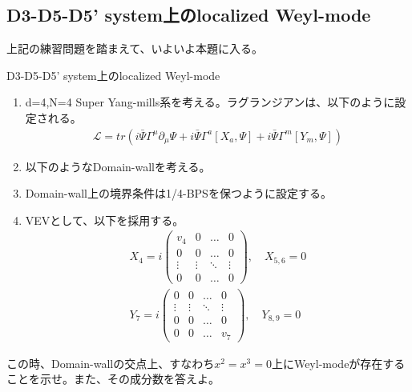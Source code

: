 \documentclass[dvipdfmx,a4paper,10.5pt]{article}
\numberwithin{equation}{section}
\begin{document}
\subsection{D3-D5-D5' system上のlocalized Weyl-mode}
上記の練習問題を踏まえて、いよいよ本題に入る。
\begin{problembox}{D3-D5-D5' system上のlocalized Weyl-mode}
    \begin{enumerate}
        \item d=4,N=4 Super Yang-mills系を考える。ラグランジアンは、以下のように設定される。
        \begin{align*}
            \mathcal{L}=tr(i\bar{\Psi}\Gamma^{\mu}\partial_{\mu}\Psi+i\bar{\Psi}\Gamma^{a}[X_{a},\Psi]+i\bar{\Psi}\Gamma^{m}[Y_{m},\Psi])
        \end{align*}
        \item 以下のようなDomain-wallを考える。
        \item Domain-wall上の境界条件は1/4-BPSを保つように設定する。
        \item VEVとして、以下を採用する。
        \begin{align*}
            X_{4}=i \begin{pmatrix} 
  v_{4} & 0 & \dots  & 0 \\
  0 & 0 & \dots  & 0 \\
  \vdots & \vdots & \ddots & \vdots \\
  0 & 0 & \dots  & 0
\end{pmatrix} ,\quad X_{5,6}=0\\
Y_{7}=i \begin{pmatrix} 
  0 & 0 & \dots  & 0 \\
  \vdots & \vdots & \ddots & \vdots \\
  0 & 0 & \dots  & 0 \\
  0 & 0 & \dots  & v_{7}
\end{pmatrix},\quad Y_{8,9}=0
        \end{align*}
    \end{enumerate}
    この時、Domain-wallの交点上、すなわち$x^{2}=x^{3}=0$上にWeyl-modeが存在することを示せ。また、その成分数を答えよ。
\end{problembox}
\end{document}
